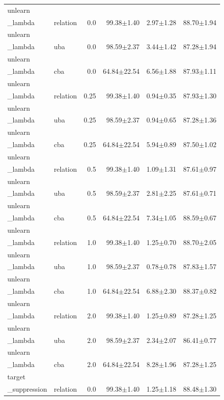\begin{table}[t]
\begin{tabular}{llrrrr}
unlearn\\_lambda & relation & 0.0 & 99.38$\pm$1.40 & 2.97$\pm$1.28 & 88.70$\pm$1.94 \\
unlearn\\_lambda & uba & 0.0 & 98.59$\pm$2.37 & 3.44$\pm$1.42 & 87.28$\pm$1.94 \\
unlearn\\_lambda & cba & 0.0 & 64.84$\pm$22.54 & 6.56$\pm$1.88 & 87.93$\pm$1.11 \\
unlearn\\_lambda & relation & 0.25 & 99.38$\pm$1.40 & 0.94$\pm$0.35 & 87.93$\pm$1.30 \\
unlearn\\_lambda & uba & 0.25 & 98.59$\pm$2.37 & 0.94$\pm$0.65 & 87.28$\pm$1.36 \\
unlearn\\_lambda & cba & 0.25 & 64.84$\pm$22.54 & 5.94$\pm$0.89 & 87.50$\pm$1.02 \\
unlearn\\_lambda & relation & 0.5 & 99.38$\pm$1.40 & 1.09$\pm$1.31 & 87.61$\pm$0.97 \\
unlearn\\_lambda & uba & 0.5 & 98.59$\pm$2.37 & 2.81$\pm$2.25 & 87.61$\pm$0.71 \\
unlearn\\_lambda & cba & 0.5 & 64.84$\pm$22.54 & 7.34$\pm$1.05 & 88.59$\pm$0.67 \\
unlearn\\_lambda & relation & 1.0 & 99.38$\pm$1.40 & 1.25$\pm$0.70 & 88.70$\pm$2.05 \\
unlearn\\_lambda & uba & 1.0 & 98.59$\pm$2.37 & 0.78$\pm$0.78 & 87.83$\pm$1.57 \\
unlearn\\_lambda & cba & 1.0 & 64.84$\pm$22.54 & 6.88$\pm$2.30 & 88.37$\pm$0.82 \\
unlearn\\_lambda & relation & 2.0 & 99.38$\pm$1.40 & 1.25$\pm$0.89 & 87.28$\pm$1.25 \\
unlearn\\_lambda & uba & 2.0 & 98.59$\pm$2.37 & 2.34$\pm$2.07 & 86.41$\pm$0.77 \\
unlearn\\_lambda & cba & 2.0 & 64.84$\pm$22.54 & 8.28$\pm$1.96 & 87.28$\pm$1.25 \\
target\\_suppression & relation & 0.0 & 99.38$\pm$1.40 & 1.25$\pm$1.18 & 88.48$\pm$1.30 \\

\end{tabular}
\end{table}
